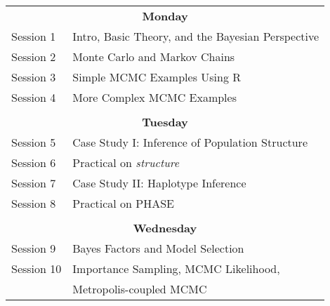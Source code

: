 \begin{tabular}{ll}
\multicolumn{2}{c}{\bf Monday}\\
Session 1  &   Intro, Basic Theory, and the Bayesian Perspective \\
Session 2  &   Monte Carlo and Markov Chains\\
Session 3  &   Simple MCMC Examples Using R\\
Session 4  &   More Complex MCMC Examples\\
\\
\multicolumn{2}{c}{\bf Tuesday}\\
Session 5  &   Case Study I:   Inference of Population Structure\\
Session 6  &   Practical on {\em structure}\\
Session 7  &   Case Study II:   Haplotype Inference\\
Session 8  &   Practical on PHASE\\
\\
\multicolumn{2}{c}{\bf Wednesday}\\
Session 9   &   Bayes Factors and Model Selection\\
Session 10  &   Importance Sampling, MCMC Likelihood, \\
 & Metropolis-coupled MCMC\\
\end{tabular}
